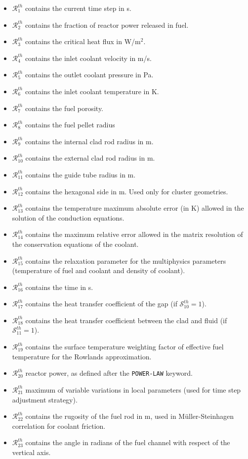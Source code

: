 \begin{itemize}
\item $\mathcal{R}^{th}_{1}$ contains the current time step in s. 
\item $\mathcal{R}^{th}_{2}$ contains the fraction of reactor power released in fuel.
\item $\mathcal{R}^{th}_{3}$ contains the critical heat flux in W/m$^2$.
\item $\mathcal{R}^{th}_{4}$ contains the inlet coolant velocity in m/s.
\item $\mathcal{R}^{th}_{5}$ contains the outlet coolant pressure in Pa.
\item $\mathcal{R}^{th}_{6}$ contains the inlet coolant temperature in K.
\item $\mathcal{R}^{th}_{7}$ contains the fuel porosity.
\item $\mathcal{R}^{th}_{8}$ contains the fuel pellet radius
\item $\mathcal{R}^{th}_{9}$ contains the internal clad rod radius in m.
\item $\mathcal{R}^{th}_{10}$ contains the external clad rod radius in m.
\item $\mathcal{R}^{th}_{11}$ contains the guide tube radius in m.
\item $\mathcal{R}^{th}_{12}$ contains the hexagonal side in m. Used only for cluster geometries.
\item $\mathcal{R}^{th}_{13}$ contains the temperature maximum absolute error (in K) allowed in the solution of the conduction equations.
\item $\mathcal{R}^{th}_{14}$ contains the maximum relative error allowed in the matrix resolution of the conservation equations of the coolant.
\item $\mathcal{R}^{th}_{15}$ contains the relaxation parameter for the multiphysics parameters (temperature of fuel and coolant  and density of coolant).
\item $\mathcal{R}^{th}_{16}$ contains the time in s.
\item $\mathcal{R}^{th}_{17}$ contains the heat transfer coefficient of the gap (if $\mathcal{S}^{th}_{10}=1$).
\item $\mathcal{R}^{th}_{18}$ contains the heat transfer coefficient between the clad and fluid (if $\mathcal{S}^{th}_{11}=1$).
\item $\mathcal{R}^{th}_{19}$ contains the surface temperature weighting factor of effective fuel temperature for the Rowlands approximation.
\item $\mathcal{R}^{th}_{20}$ reactor power, as defined after the {\tt POWER-LAW} keyword.
\item $\mathcal{R}^{th}_{21}$ maximum of variable variations in local parameters (used for time step adjustment strategy).
\item $\mathcal{R}^{th}_{22}$ contains the rugosity of the fuel rod in m, used in M\"uller-Steinhagen correlation for coolant friction.
\item $\mathcal{R}^{th}_{23}$ contains the angle in radians of the fuel channel with respect of the vertical axis.
\end{itemize}

